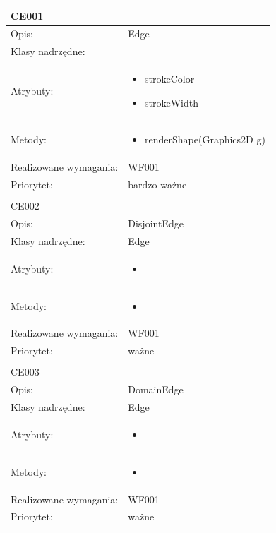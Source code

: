 \documentclass[a4paper,10pt]{article}
\begin{document}
\begin{center}

\begin{longtable}{|m{3cm}|m{9cm}|} \hline

CE001 &  \\ \hline
Opis: & Edge    \\ \hline
Klasy nadrzędne: &     \\ \hline
Atrybuty: & \begin{itemize}
 \item strokeColor
 \item strokeWidth 
\end{itemize}
 \\ \hline
Metody: & \begin{itemize}
 \item renderShape(Graphics2D g)
\end{itemize}
  \\ \hline
Realizowane wymagania: & WF001 \\ \hline
Priorytet: & bardzo ważne  \\ \hline

\multicolumn{2}{c}{} \\
 \hline

CE002 &  \\ \hline
Opis: & DisjointEdge    \\ \hline
Klasy nadrzędne: & Edge    \\ \hline
Atrybuty: & \begin{itemize}
 \item 
\end{itemize}
 \\ \hline
Metody: & \begin{itemize}
 \item 
\end{itemize}
  \\ \hline
Realizowane wymagania: & WF001 \\ \hline
Priorytet: & ważne  \\ \hline

\multicolumn{2}{c}{} \\
 \hline

CE003 &  \\ \hline
Opis: & DomainEdge    \\ \hline
Klasy nadrzędne: & Edge    \\ \hline
Atrybuty: & \begin{itemize}
 \item 
\end{itemize}
 \\ \hline
Metody: & \begin{itemize}
 \item 
\end{itemize}
  \\ \hline
Realizowane wymagania: & WF001 \\ \hline
Priorytet: & ważne  \\ \hline


\end{longtable}
\end{center}
\end{document}
